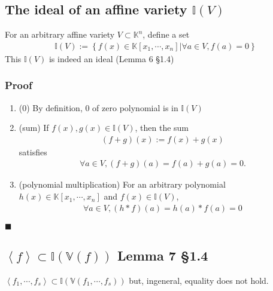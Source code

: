 \documentclass[11pt]{book}
\begin{document}
\subsection{The ideal of an affine variety $\mathbb{I}(V)$}
For an arbitrary affine variety $V \subset \mathbb{K}^n$, define a set
\begin{eqnarray}
\mathbb{I}(V) := \left\{\left. f(x) \in \mathbb{K}[x_1,\cdots,x_n] \right| \forall a \in V, f(a) = 0 \right\}
\end{eqnarray}
This $\mathbb{I}(V)$ is indeed an ideal (Lemma 6 \S1.4)

\subsubsection{Proof}
\begin{enumerate}
\item (0)
By definition, 0 of zero polynomial is in $\mathbb{I}(V)$

\item (sum)
If $f(x), g(x) \in \mathbb{I}(V)$, then the sum
\begin{eqnarray}
(f + g)(x) := f(x) + g(x)
\end{eqnarray}
satisfies
\begin{eqnarray}
\forall a \in V, (f + g)(a) = f(a) + g(a) = 0.
\end{eqnarray}

\item (polynomial multiplication)
For an arbitrary polynomial $h(x) \in \mathbb{K}[x_1,\cdots,x_n]$ and $f(x) \in \mathbb{I}(V)$,
\begin{eqnarray}
\forall a \in V, (h*f)(a) = h(a) * f(a) = 0
\end{eqnarray}

\end{enumerate}
$\blacksquare$

\subsection{$\left< f \right> \subset \mathbb{I}\left( \mathbb{V} \left( f \right) \right)$ Lemma 7 \S1.4}
$\left< f_1, \cdots, f_s \right> \subset \mathbb{I}\left( \mathbb{V} \left( f_1, \cdots, f_s \right) \right)$ but, ingeneral, equality does not hold.
\end{document}
